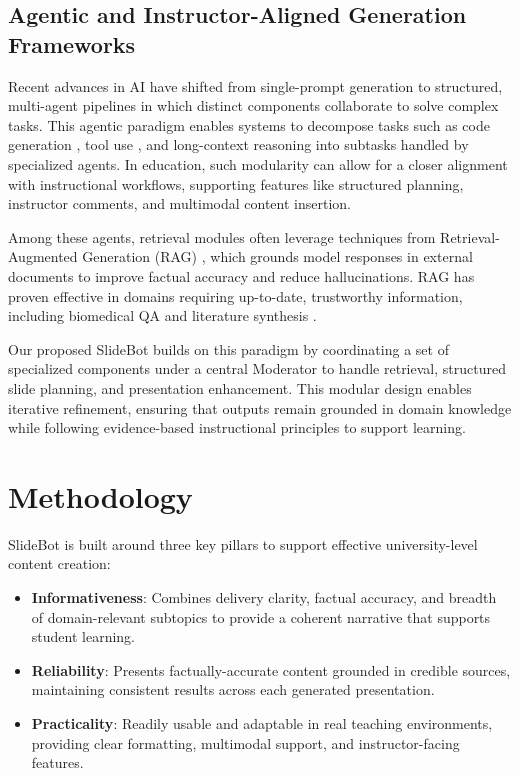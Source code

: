 \documentclass[letterpaper]{article} %
\begin{document}
\subsection{Agentic and Instructor-Aligned Generation Frameworks}

Recent advances in AI have shifted from single-prompt generation to structured, multi-agent pipelines in which distinct components collaborate to solve complex tasks. This agentic paradigm enables systems to decompose tasks such as code generation \citep{yang2024swe}, tool use \citep{schick2023toolformer}, and long-context reasoning \citep{lu2023chameleon} into subtasks handled by specialized agents. In education, such modularity can allow for a closer alignment with instructional workflows, supporting features like structured planning, instructor comments, and multimodal content insertion.

Among these agents, retrieval modules often leverage techniques from Retrieval-Augmented Generation (RAG) \citep{lewis2020retrieval}, which grounds model responses in external documents to improve factual accuracy and reduce hallucinations. RAG has proven effective in domains requiring up-to-date, trustworthy information, including biomedical QA \citep{jin2023retrieve, lala2023paperqa} and literature synthesis \citep{jiang2023active, mialon2023augmented}.

Our proposed SlideBot builds on this paradigm by coordinating a set of specialized components under a central Moderator to handle retrieval, structured slide planning, and presentation enhancement. This modular design enables iterative refinement, ensuring that outputs remain grounded in domain knowledge while following evidence-based instructional principles to support learning.


\section{Methodology} \label{sec:method}


SlideBot is built around three key pillars to support effective university-level content creation:

\begin{itemize}
    \item \textbf{Informativeness}: Combines delivery clarity, factual accuracy, and breadth of domain-relevant subtopics to provide a coherent narrative that supports student learning.
    \item \textbf{Reliability}: Presents factually-accurate content grounded in credible sources, maintaining consistent results across each generated presentation. 
    \item \textbf{Practicality}: Readily usable and adaptable in real teaching environments, providing clear formatting, multimodal support, and instructor-facing features. 
\end{itemize}
\end{document}

